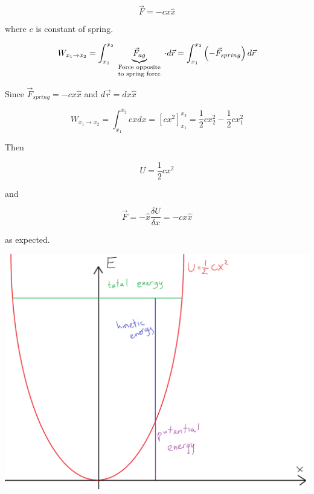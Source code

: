 $$\vec{F}=-cx\hat{x}$$

where $c$ is constant of spring.

$$W_{x_1 \to x_2} = \int_{x_1}^{x_2} \underbrace{\vec{F}_{ag}}_{\parbox{2cm}{\centering \scriptsize Force opposite to spring force}} \cdot d\vec{r} = \int_{x_1}^{x_2} \left(-\vec{F}_{spring} \right) d\vec{r} $$

Since $\vec{F}_{spring} = -cx\hat{x}$ and $d\vec{r} = dx\hat{x}$

$$W_{x_1 \to x_2} = \int_{x_1}^{x_2} cx dx = \left[ cx^2 \right]_{x_1}^{x_2} = \frac{1}{2}c x_2^2 - \frac{1}{2}c x_1^2$$

Then

$$U  = \frac{1}{2}cx^2$$

and

$$\vec{F}  = -\hat{x} \frac{\delta U}{\delta x} = -cx\hat{x}$$

as expected.

\begin{center}
	\includegraphics[width=\linewidth]{./lect10/pic3.png}
\end{center}